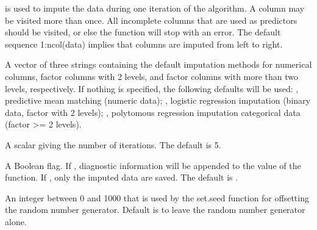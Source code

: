 \begin{Arguments}
\begin{ldescription}
is used to impute the data during one iteration of the algorithm. A
column may be visited more than once. All incomplete columns that are
used as predictors should be visited, or else the function will stop
with an error. The default sequence 1:ncol(data) implies that columns
are imputed from left to right.
\item[\code{defaultImputationMethod}] A vector of three strings containing the default imputation methods for numerical columns, factor 
columns with 2 levels, and factor columns with more than two levels, respectively. If nothing is 
specified, the following defaults will be used:
, predictive mean matching (numeric data);
, logistic regression imputation (binary data, factor with 2 levels);
, polytomous regression imputation categorical data (factor >= 2 levels).
\item[\code{maxit}] A scalar giving the number of iterations. The default is 5.
\item[\code{diagnostics}] A Boolean flag. If , diagnostic
information will be appended to the value of the function. If
, only the imputed data are saved. The default is .
\item[\code{printFlag}] 
\item[\code{seed}] An integer between 0 and 1000 that is used by the
set.seed function for offsetting the random number generator. Default is to leave the random number generator alone.
\end{ldescription}
\end{Arguments}
